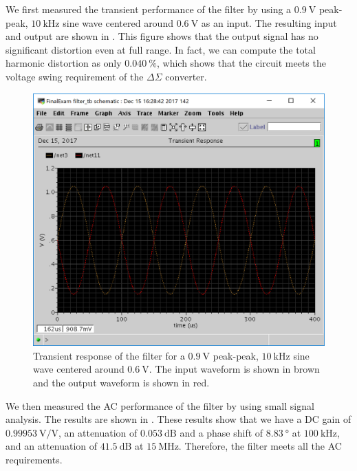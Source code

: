 \documentclass[journal,hidelinks]{IEEEtran}
\begin{document}
We first measured the transient performance of the filter by using a $\SI{0.9}{\volt}$ peak-peak, $\SI{10}{\kilo\hertz}$ sine wave centered around $\SI{0.6}{\volt}$ as an input. The resulting input and output are shown in . This figure shows that the output signal has no significant distortion even at full range. In fact, we can compute the total harmonic distortion as only $\SI{0.040}{\percent}$, which shows that the circuit meets the voltage swing requirement of the $\Delta \Sigma$ converter.

\begin{figure}[!htb]
  \centering
  \includegraphics[width=\columnwidth]{results/filter_tran.png}
  \caption{Transient response of the filter for a $\SI{0.9}{\volt}$ peak-peak, $\SI{10}{\kilo\hertz}$ sine wave centered around $\SI{0.6}{\volt}$. The input waveform is shown in brown and the output waveform is shown in red.}
  \label{fig:filter_tran}
\end{figure}

We then measured the AC performance of the filter by using small signal analysis. The results are shown in . These results show that we have a DC gain of $\SI{0.99953}{\volt\per\volt}$, an attenuation of $\SI{0.053}{\deci\bel}$ and a phase shift of $\SI{8.83}{\degree}$ at $\SI{100}{\kilo\hertz}$, and an attenuation of $\SI{41.5}{\deci\bel}$ at $\SI{15}{\mega\hertz}$. Therefore, the filter meets all the AC requirements.
\end{document}
